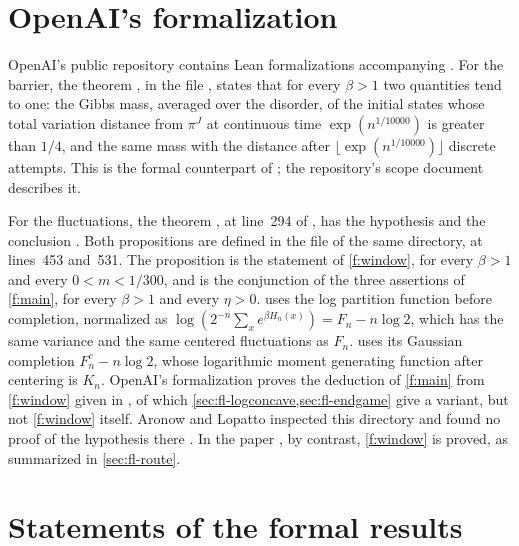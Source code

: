 \section{OpenAI's formalization}\label{sec:formal-oai}

OpenAI's public repository \cite{oai-math-lean} contains Lean formalizations accompanying \cite{oai-barriers,oai-fluctuations}. For the barrier, the theorem , in the file , states that for every $\beta>1$ two quantities tend to one: the Gibbs mass, averaged over the disorder, of the initial states whose total variation distance from $\pi^J$ at continuous time $\exp(n^{1/10000})$ is greater than $1/4$, and the same mass with the distance after $\lfloor\exp(n^{1/10000})\rfloor$ discrete attempts. This is the formal counterpart of \cite[Theorem~1.1]{oai-barriers}; the repository's scope document  describes it.

For the fluctuations, the theorem , at line~294 of , has the hypothesis  and the conclusion . Both propositions are defined in the file  of the same directory, at lines~453 and~531. The proposition  is the statement of \cref{f:window}, for every $\beta>1$ and every $0<m<1/300$, and  is the conjunction of the three assertions of \cref{f:main}, for every $\beta>1$ and every $\eta>0$.  uses the log partition function before completion, normalized as $\log(2^{-n}\sum_xe^{\beta H_n(x)})=F_n-n\log2$, which has the same variance and the same centered fluctuations as $F_n$.  uses its Gaussian completion $F_n^c-n\log2$, whose logarithmic moment generating function after centering is $K_n$. OpenAI's formalization proves the deduction of \cref{f:main} from \cref{f:window} given in \cite[Sections~7.5 and~7.6]{oai-fluctuations}, of which \cref{sec:fl-logconcave,sec:fl-endgame} give a variant, but not \cref{f:window} itself. Aronow and Lopatto inspected this directory and found no proof of the hypothesis there \cite[Section~1.6, footnote~1]{hexagon-bias}. In the paper \cite{oai-fluctuations}, by contrast, \cref{f:window} is proved, as summarized in \cref{sec:fl-route}.

\section{Statements of the formal results}\label{sec:formal-statements}

